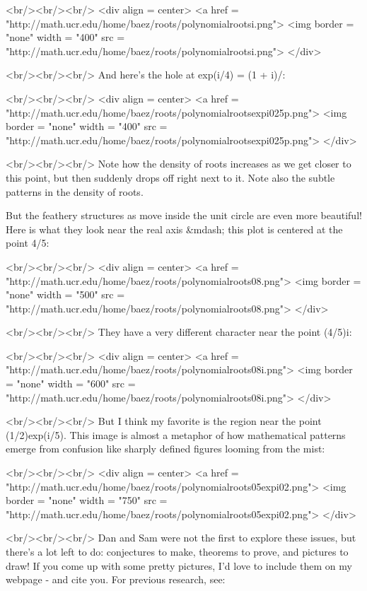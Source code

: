 <br/><br/><br/>
<div align = center>
<a href = "http://math.ucr.edu/home/baez/roots/polynomialrootsi.png">
<img border = "none" width = "400" src = "http://math.ucr.edu/home/baez/roots/polynomialrootsi.png">
</div>

<br/><br/><br/>
And here's the hole at exp(i\pi /4) = (1 + i)/:

<br/><br/><br/>
<div align = center>
<a href = "http://math.ucr.edu/home/baez/roots/polynomialrootsexpi025p.png">
<img border = "none" width = "400" src = "http://math.ucr.edu/home/baez/roots/polynomialrootsexpi025p.png">
</div>

<br/><br/><br/>
Note how the density of roots increases as we get closer to
this point, but then suddenly drops off right next to it.  Note
also the subtle patterns in the density of roots.

But the feathery structures as move inside the unit circle are
even more beautiful!  Here is what they look near the real axis &mdash;
this plot is centered at the point 4/5:

<br/><br/><br/>
<div align = center>
<a href = "http://math.ucr.edu/home/baez/roots/polynomialroots08.png">
<img border = "none" width = "500" src = "http://math.ucr.edu/home/baez/roots/polynomialroots08.png">
</div>

<br/><br/><br/>
They have a very different character near the point (4/5)i:

<br/><br/><br/>
<div align = center>
<a href = "http://math.ucr.edu/home/baez/roots/polynomialroots08i.png">
<img border = "none" width = "600" src = "http://math.ucr.edu/home/baez/roots/polynomialroots08i.png">
</div>

<br/><br/><br/> But I think my favorite is the region near the point
(1/2)exp(i/5).  This image is almost a metaphor of how mathematical
patterns emerge from confusion like sharply defined figures looming
from the mist:

<br/><br/><br/>
<div align = center>
<a href = "http://math.ucr.edu/home/baez/roots/polynomialroots05expi02.png">
<img border = "none" width = "750" src = "http://math.ucr.edu/home/baez/roots/polynomialroots05expi02.png">
</div>

<br/><br/><br/>
Dan and Sam were not the first to explore these issues, but there's
a lot left to do: conjectures to make, theorems to prove, and 
pictures to draw!  If you come up with some pretty pictures, I'd
love to include them on my webpage - and cite you.   For previous 
research, see:


